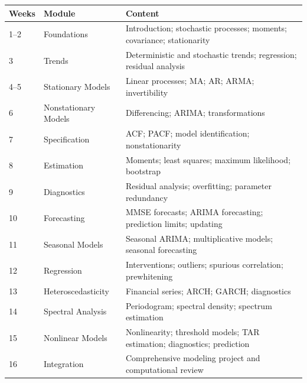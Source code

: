 \documentclass[11pt,a4paper]{article}
\begin{document}
\begin{longtable}{p{}p{}p{}}
\toprule
\textbf{Weeks} & \textbf{Module} & \textbf{Content} \\
\midrule
1--2 & Foundations &
Introduction; stochastic processes; moments; covariance; stationarity \\

3 & Trends &
Deterministic and stochastic trends; regression; residual analysis \\

4--5 & Stationary Models &
Linear processes; MA; AR; ARMA; invertibility \\

6 & Nonstationary Models &
Differencing; ARIMA; transformations \\

7 & Specification &
ACF; PACF; model identification; nonstationarity \\

8 & Estimation &
Moments; least squares; maximum likelihood; bootstrap \\

9 & Diagnostics &
Residual analysis; overfitting; parameter redundancy \\

10 & Forecasting &
MMSE forecasts; ARIMA forecasting; prediction limits; updating \\

11 & Seasonal Models &
Seasonal ARIMA; multiplicative models; seasonal forecasting \\

12 & Regression &
Interventions; outliers; spurious correlation; prewhitening \\

13 & Heteroscedasticity &
Financial series; ARCH; GARCH; diagnostics \\

14 & Spectral Analysis &
Periodogram; spectral density; spectrum estimation \\

15 & Nonlinear Models &
Nonlinearity; threshold models; TAR estimation; diagnostics; prediction \\

16 & Integration &
Comprehensive modeling project and computational review \\
\bottomrule
\end{longtable}

\end{document}
